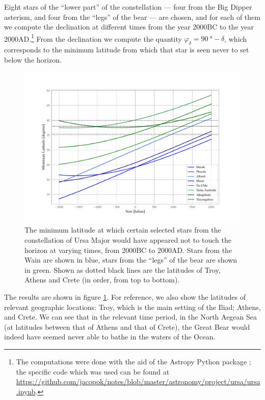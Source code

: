 \documentclass[main.tex]{subfiles}
\begin{document}
Eight stars of the ``lower part'' of the constellation --- four from the Big Dipper asterism, and four from the ``legs'' of the bear --- are chosen, and for each of them we compute the declination at different times from the year 2000BC to the year 2000AD.\footnote{The computations were done with the aid of the Astropy Python package \cite[]{astropycollaborationAstropyProjectBuilding2018}; the specific code which was used can be found at \url{https://github.com/jacopok/notes/blob/master/astronomy/project/ursa/ursa.ipynb}.}
From the declination we compute the quantity \(\varphi _\delta  = \SI{90}{\degree} - \delta \), which corresponds to the minimum latitude from which that star is seen never to set below the horizon. 

\begin{figure}[ht]
\centering
\includegraphics[width=\textwidth]{figures/Ursa.pdf}
\caption{The minimum latitude at which certain selected stars from the constellation of Ursa Major would have appeared not to touch the horizon at varying times, from 2000BC to 2000AD. Stars from the Wain are shown in blue, stars from the ``legs'' of the bear are shown in green. Shown as dotted black lines are the latitudes of Troy, Athens and Crete (in order, from top to bottom).}
\label{fig:ursa}
\end{figure}

The results are shown in figure \ref{fig:ursa}. For reference, we also show the latitudes of relevant geographic locations: Troy, which is the main setting of the Iliad; Athens, and Crete. 
We can see that in the relevant time period, in the North Aegean Sea (at latitudes between that of Athens and that of Crete), the Great Bear would indeed have seemed never able to bathe in the waters of the Ocean.
\end{document}
